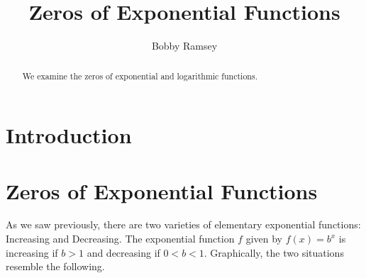 \documentclass[nooutcomes]{ximera}
\author{Bobby Ramsey}
\title{Zeros of Exponential Functions}
\begin{document}
\begin{abstract}
 	We examine the zeros of exponential and logarithmic functions.
\end{abstract}
\maketitle




\section{Introduction}

	



\section{Zeros of Exponential Functions}

	As we saw previously, there are two varieties of elementary exponential functions: Increasing and Decreasing. The exponential function $f$ given by 
	$f(x) = b^x$ is increasing if $b>1$ and decreasing if $0 < b < 1$. Graphically, the two situations resemble the following. 
\end{document}
